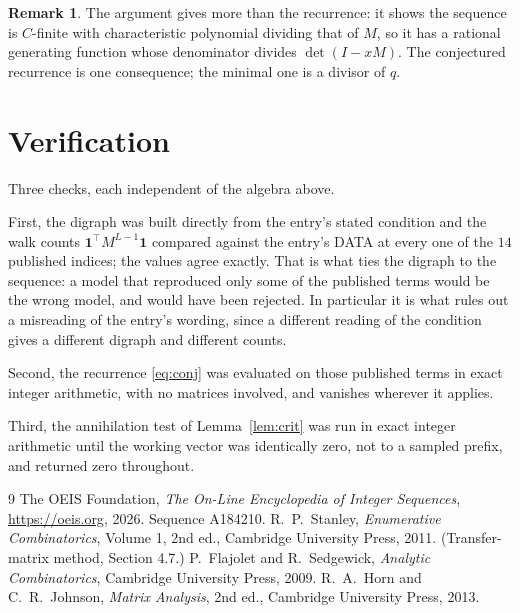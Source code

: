 \documentclass[11pt,a4paper]{article}
\theoremstyle{plain}
\theoremstyle{definition}
\newtheorem{remark}[theorem]{Remark}
\begin{document}
\begin{remark}
The argument gives more than the recurrence: it shows the sequence is $C$-finite with
characteristic polynomial dividing that of $M$, so it has a rational generating function
whose denominator divides $\det(I-xM)$. The conjectured recurrence is one consequence; the
minimal one is a divisor of $q$.
\end{remark}

\section{Verification}

Three checks, each independent of the algebra above.

First, the digraph was built directly from the entry's stated condition and the walk counts
$\mathbf{1}^{\!\top}M^{L-1}\mathbf{1}$ compared against the entry's DATA at
every one of the $14$ published indices; the values agree exactly. That is what ties
the digraph to the sequence: a model that reproduced only some of the published terms would
be the wrong model, and would have been rejected. In particular it is what rules out a
misreading of the entry's wording, since a different reading of the condition gives a
different digraph and different counts.

Second, the recurrence \eqref{eq:conj} was evaluated on those published terms in exact
integer arithmetic, with no matrices involved, and vanishes wherever it applies.

Third, the annihilation test of Lemma~\ref{lem:crit} was run in exact integer arithmetic
until the working vector was identically zero, not to a sampled prefix, and returned zero
throughout.

\begin{thebibliography}{9}
 The OEIS Foundation, \emph{The On-Line Encyclopedia of Integer
Sequences}, \url{https://oeis.org}, 2026. Sequence A184210.
 R.~P.~Stanley, \emph{Enumerative Combinatorics}, Volume 1, 2nd ed.,
Cambridge University Press, 2011. (Transfer-matrix method, Section 4.7.)
 P.~Flajolet and R.~Sedgewick, \emph{Analytic Combinatorics}, Cambridge
University Press, 2009.
 R.~A.~Horn and C.~R.~Johnson, \emph{Matrix Analysis}, 2nd ed., Cambridge
University Press, 2013.
\end{thebibliography}
\end{document}
